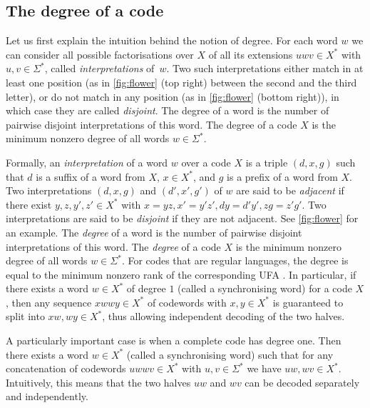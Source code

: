 \documentclass[11pt,a4paper]{amsart}
\theoremstyle{plain}
\theoremstyle{definition}
\theoremstyle{defC}
\theoremstyle{thmC}
\theoremstyle{plain}
\numberwithin{equation}{section}
\begin{document}
\subsection{The degree of a code}
Let us first explain the intuition behind the notion of degree. For each word $w$ we can consider all possible factorisations over $X$ of all its extensions $uwv \in X^*$ with $u, v \in \Sigma^*$, called \emph{interpretations} of~$w$. Two such interpretations either match in at least one position (as in \autoref{fig:flower} (top right) between the second and the third letter), or do not match in any position (as in \autoref{fig:flower} (bottom right)), in which case they are called \emph{disjoint}. The degree of a word is the number of pairwise disjoint interpretations of this word. The degree of a code
$X$ is the minimum nonzero degree of all words $w \in \Sigma^*$. 

Formally, an \emph{interpretation} of a word $w$ over a code $X$ is a triple $(d, x, g)$ such that $d$ is a suffix of a word from $X$, $x \in X^*$, and $g$ is a prefix of a word from $X$. Two interpretations $(d, x, g)$ and $(d', x', g')$ of $w$ are said to be \emph{adjacent} if there exist $y, z, y', z' \in X^*$ with 
$x = yz, x' = y'z', dy = d'y', zg = z'g'.$ Two interpretations are said to be \emph{disjoint} if they are not adjacent. See \autoref{fig:flower} for an example. The \emph{degree} of a word is the number of pairwise disjoint interpretations of this word. The \emph{degree} of a code $X$ is the minimum nonzero degree of all words $w \in \Sigma^*$. For codes that are regular languages, the degree is equal to the minimum nonzero rank of the corresponding UFA \cite[Proposition 9.6.1]{Berstel2010}. In particular, if there exists a word $w \in X^*$ of degree $1$ (called a synchronising word) for a code $X$, then any sequence $xwwy \in X^*$ of codewords with $x, y \in X^*$ is guaranteed to split into $xw, wy \in X^*$, thus allowing independent decoding of the two halves.

A particularly important case is when a complete code has degree one. Then
there exists a word $w \in X^*$ (called a synchronising word) such that for any concatenation of codewords $uwwv \in X^*$  with $u, v \in \Sigma^*$ we have $uw, wv \in X^*$. Intuitively, this means that the two halves $uw$ and $wv$ can be decoded separately and independently.
\end{document}
